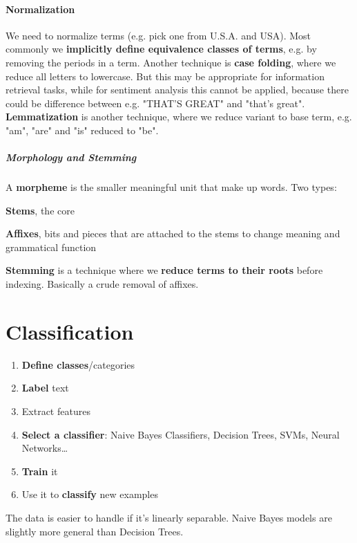 \documentclass[10pt]{report}
\begin{document}
\paragraph{Normalization} We need to normalize terms (e.g. pick one from U.S.A. and USA). Most commonly we \textbf{implicitly define equivalence classes of terms}, e.g. by removing the periods in a term. Another technique is \textbf{case folding}, where we reduce all letters to lowercase. But this may be appropriate for information retrieval tasks, while for sentiment analysis this cannot be applied, because there could be difference between e.g. "THAT'S GREAT" and "that's great".\\
\textbf{Lemmatization} is another technique, where we reduce variant to base term, e.g. "am", "are" and "is" reduced to "be".
\subparagraph{Morphology and Stemming} A \textbf{morpheme} is the smaller meaningful unit that make up words. Two types:
\begin{list}{}{}
	\item \textbf{Stems}, the core
	\item \textbf{Affixes}, bits and pieces that are attached to the stems to change meaning and grammatical function
\end{list}
\textbf{Stemming} is a technique where we \textbf{reduce terms to their roots} before indexing. Basically a crude removal of affixes.
\section{Classification}
\begin{enumerate}
	\item \textbf{Define classes}/categories
	\item \textbf{Label} text
	\item Extract features
	\item \textbf{Select a classifier}: Naive Bayes Classifiers, Decision Trees, SVMs, Neural Networks\ldots
	\item \textbf{Train} it
	\item Use it to \textbf{classify} new examples
\end{enumerate}
The data is easier to handle if it's linearly separable. Naive Bayes models are slightly more general than Decision Trees.
\end{document}
